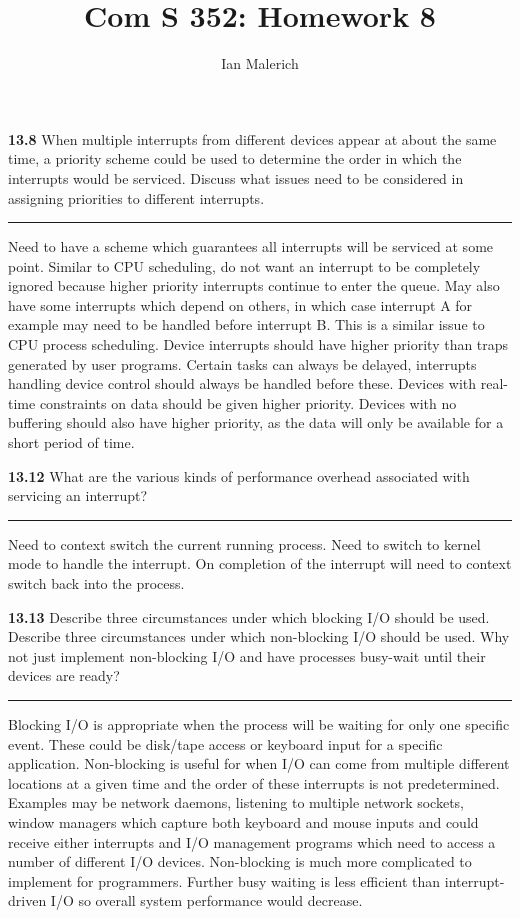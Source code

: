 \documentclass[12pt]{jhwhw}
\author{Ian Malerich}
\title{Com S 352: Homework 8}
\begin{document}
\raggedright

\textbf{13.8}
	When multiple interrupts from different devices appear at about the same time,
	a priority scheme could be used to determine the order in which the interrupts would 
	be serviced. Discuss what issues need to be considered in assigning priorities to different
	interrupts.
\textcolor[RGB]{240,240,240}{\rule{\textwidth}{0.5pt}}\bigbreak

	\begin{addmargin}[1em]{}
		Need to have a scheme which guarantees all interrupts will be serviced at some point.
		Similar to CPU scheduling, do not want an interrupt to be completely ignored because
		higher priority interrupts continue to enter the queue. May also have some interrupts
		which depend on others, in which case interrupt A for example may need to be handled
		before interrupt B. This is a similar issue to CPU process scheduling.
		Device interrupts should have higher priority than traps generated by user programs.
		Certain tasks can always be delayed, interrupts handling device control should always
		be handled before these. Devices with real-time constraints on data should
		be given higher priority. Devices with no buffering should also have higher priority,
		as the data will only be available for a short period of time.
	\end{addmargin}

\bigbreak
\textbf{13.12}  
	What are the various kinds of performance overhead associated with servicing an interrupt?
\textcolor[RGB]{240,240,240}{\rule{\textwidth}{0.5pt}}\bigbreak

	\begin{addmargin}[1em]{}
		Need to context switch the current running process. Need to switch to kernel mode to handle
		the interrupt. On completion of the interrupt will need to context switch back into the process.
	\end{addmargin}

\bigbreak
\textbf{13.13}  
	Describe three circumstances under which blocking I/O should be used. Describe three
	circumstances under which non-blocking I/O should be used. Why not just implement non-blocking
	I/O and have processes busy-wait until their devices are ready?
\textcolor[RGB]{240,240,240}{\rule{\textwidth}{0.5pt}}\bigbreak

	\begin{addmargin}[1em]{}
		Blocking I/O is appropriate when the process will be waiting for only one specific event.
		These could be disk/tape access or keyboard input for a specific application.
		Non-blocking is useful for when I/O can come from multiple different locations at a given time
		and the order of these interrupts is not predetermined. Examples may be network 
		daemons, listening to multiple network sockets, window managers which capture both 
		keyboard and mouse inputs and could receive either interrupts and I/O management programs
		which need to access a number of different I/O devices. 
		\bigbreak
		Non-blocking is much more complicated to implement for programmers. Further busy waiting
		is less efficient than interrupt-driven I/O so overall system performance would decrease.
	\end{addmargin}
\end{document}
